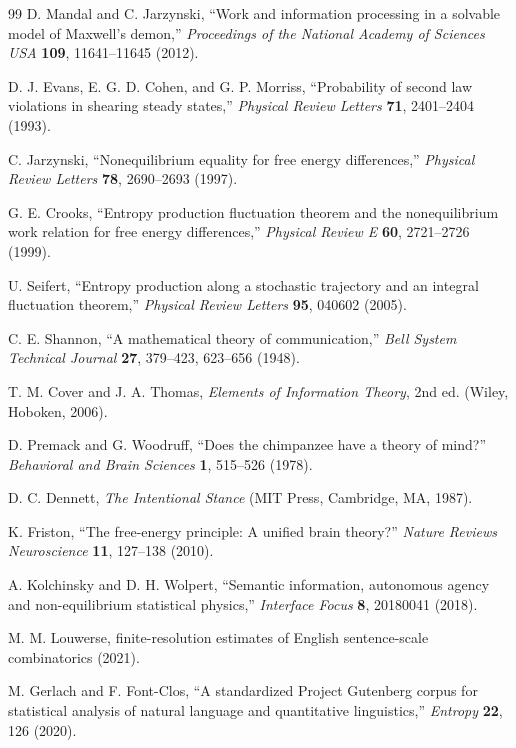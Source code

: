 \documentclass[
  aps,
  prresearch,
  reprint,
  amsmath,
  amssymb,
  superscriptaddress,
  nofootinbib,
  longbibliography
]{revtex4-2}
\begin{document}
\begin{thebibliography}{99}
D. Mandal and C. Jarzynski, ``Work and information processing in a solvable model of Maxwell's demon,'' \emph{Proceedings of the National Academy of Sciences USA} \textbf{109}, 11641--11645 (2012).

D. J. Evans, E. G. D. Cohen, and G. P. Morriss, ``Probability of second law violations in shearing steady states,'' \emph{Physical Review Letters} \textbf{71}, 2401--2404 (1993).

C. Jarzynski, ``Nonequilibrium equality for free energy differences,'' \emph{Physical Review Letters} \textbf{78}, 2690--2693 (1997).

G. E. Crooks, ``Entropy production fluctuation theorem and the nonequilibrium work relation for free energy differences,'' \emph{Physical Review E} \textbf{60}, 2721--2726 (1999).

U. Seifert, ``Entropy production along a stochastic trajectory and an integral fluctuation theorem,'' \emph{Physical Review Letters} \textbf{95}, 040602 (2005).

C. E. Shannon, ``A mathematical theory of communication,'' \emph{Bell System Technical Journal} \textbf{27}, 379--423, 623--656 (1948).

T. M. Cover and J. A. Thomas, \emph{Elements of Information Theory}, 2nd ed. (Wiley, Hoboken, 2006).

D. Premack and G. Woodruff, ``Does the chimpanzee have a theory of mind?'' \emph{Behavioral and Brain Sciences} \textbf{1}, 515--526 (1978).

D. C. Dennett, \emph{The Intentional Stance} (MIT Press, Cambridge, MA, 1987).

K. Friston, ``The free-energy principle: A unified brain theory?'' \emph{Nature Reviews Neuroscience} \textbf{11}, 127--138 (2010).

A. Kolchinsky and D. H. Wolpert, ``Semantic information, autonomous agency and non-equilibrium statistical physics,'' \emph{Interface Focus} \textbf{8}, 20180041 (2018).

M. M. Louwerse, finite-resolution estimates of English sentence-scale combinatorics (2021).

M. Gerlach and F. Font-Clos, ``A standardized Project Gutenberg corpus for statistical analysis of natural language and quantitative linguistics,'' \emph{Entropy} \textbf{22}, 126 (2020).


\end{thebibliography}
\end{document}
